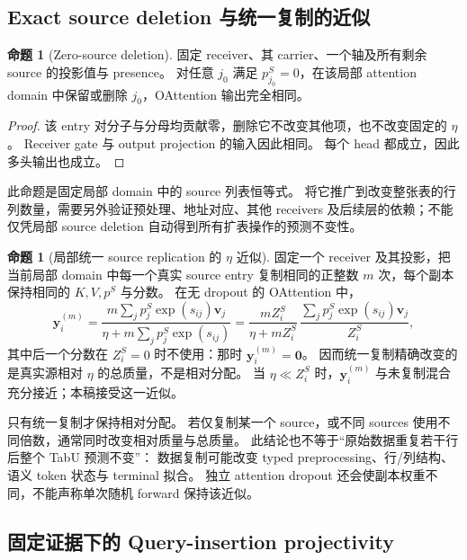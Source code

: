 \documentclass[11pt,UTF8,fontset=fandol]{ctexart}
\numberwithin{equation}{section}
\theoremstyle{definition}
\newtheorem{proposition}[definition]{命题}
\begin{document}
\subsection{Exact source deletion 与统一复制的近似}
\label{subsec:A:source-invariants}

\begin{proposition}[Zero-source deletion]
\label{prop:A:source-deletion}
固定 receiver、其 carrier、一个轴及所有剩余 source 的投影值与 presence。
对任意 $j_0$ 满足 $p_{j_0}^S=0$，在该局部 attention domain 中保留或删除
$j_0$，OAttention 输出完全相同。
\end{proposition}
\begin{proof}
该 entry 对分子与分母均贡献零，删除它不改变其他项，也不改变固定的 $\eta$。
Receiver gate 与 output projection 的输入因此相同。
每个 head 都成立，因此多头输出也成立。
\end{proof}

此命题是固定局部 domain 中的 source 列表恒等式。
将它推广到改变整张表的行列数量，需要另外验证预处理、地址对应、其他 receivers
及后续层的依赖；不能仅凭局部 source deletion 自动得到所有扩表操作的预测不变性。

\begin{proposition}[局部统一 source replication 的 $\eta$ 近似]
\label{prop:A:replication}
固定一个 receiver 及其投影，把当前局部 domain 中每一个真实 source entry
复制相同的正整数 $m$ 次，每个副本保持相同的 $K,V,p^S$ 与分数。
在无 dropout 的 OAttention 中，
\begin{equation}
  \bm y_i^{(m)}
    =\frac{m\sum_jp_j^S\exp(s_{ij})\bm v_j}
           {\eta+m\sum_jp_j^S\exp(s_{ij})}
    =\frac{mZ_i^S}{\eta+mZ_i^S}\,
     \frac{\sum_jp_j^S\exp(s_{ij})\bm v_j}{Z_i^S},
  \label{eq:A:replication-proof}
\end{equation}
其中后一个分数在 $Z_i^S=0$ 时不使用：那时 $\bm y_i^{(m)}=\bm0$。
因而统一复制精确改变的是真实源相对 $\eta$ 的总质量，不是相对分配。
当 $\eta\ll Z_i^S$ 时，$\bm y_i^{(m)}$ 与未复制混合充分接近；本稿接受这一近似。
\end{proposition}

只有统一复制才保持相对分配。
若仅复制某一个 source，或不同 sources 使用不同倍数，通常同时改变相对质量与总质量。
此结论也不等于“原始数据重复若干行后整个 TabU 预测不变”：
数据复制可能改变 typed preprocessing、行/列结构、语义 token 状态与 terminal 拟合。
独立 attention dropout 还会使副本权重不同，不能声称单次随机 forward 保持该近似。

\subsection{固定证据下的 Query-insertion projectivity}
\label{subsec:A:projectivity}
\end{document}
